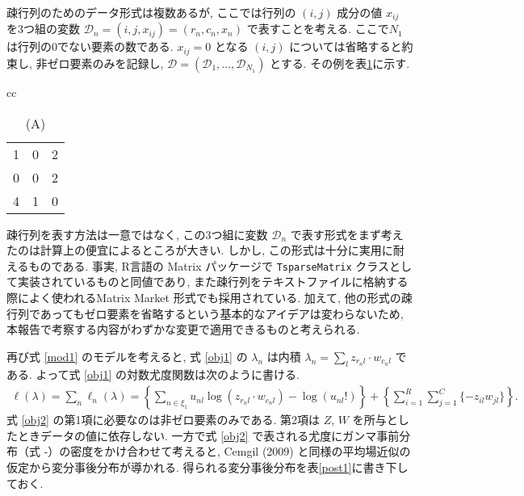 \documentclass[a4paper,12pt]{jsarticle} %
\numberwithin{equation}{section} %
\begin{document}
疎行列のためのデータ形式は複数あるが, ここでは行列の $(i,j)$ 成分の値 $x_{ij}$ を3つ組の変数 $ \mathcal{D}_n  = (i,j,x_{ij})=(r_n, c_n, x_n)$ で表すことを考える. ここで$N_1$ は行列の0でない要素の数である.  $x_{ij}=0$ となる $(i,j)$ については省略すると約束し, 非ゼロ要素のみを記録し, $\mathcal{D}=(\mathcal{D}_1, \ldots, \mathcal{D}_{N_1})$ とする. その例を表\ref{tab1}に示す. 
\begin{table}[tbp]
\centering
\caption{疎行列の例. (A)と(B)は同じ情報を持つ. (B)は本研究で扱う疎行列の形式である. }\label{tab1}
\begin{tabular}{cc}
\begin{subtable}{0.2\linewidth}\centering
{
\caption*{(A)}
\begin{tabular}{|ccc|}
\hline
1 & 0 & 2\\
0 & 0 & 2\\
4 & 1 & 0\\
\hline
\end{tabular}
}
\end{subtable}
\begin{subtable}{0.2\linewidth}
\end{subtable}
\end{tabular}
\end{table}
疎行列を表す方法は一意ではなく, この3つ組に変数 $\mathcal{D}_n$ で表す形式をまず考えたのは計算上の便宜によるところが大きい. しかし, この形式は十分に実用に耐えるものである. 事実, R言語の Matrix パッケージで \verb|TsparseMatrix| クラスとして実装されているものと同値であり, また疎行列をテキストファイルに格納する際によく使われるMatrix Market 形式でも採用されている.  %
加えて, 他の形式の疎行列であってもゼロ要素を省略するという基本的なアイデアは変わらないため, 本報告で考察する内容がわずかな変更で適用できるものと考えられる.

再び式 \eqref{mod1} のモデルを考えると, 式 \eqref{obj1} の $\lambda_n$ は内積 $\lambda_n = \sum_l  z_{r_nl} \cdot w_{c_nl}$ である. よって式 \eqref{obj1} の対数尤度関数は次のように書ける. 
\begin{align}
\ell (\lambda) = \sum_n \ell_n (\lambda) = \left\{ \sum_{n \in \xi_1} u_{nl} \log(z_{r_nl} \cdot w_{c_nl})  - \log(u_{nl}!) \right\} + \left\{  \sum_{i=1}^{R}\sum_{j=1}^C  \{-  z_{il}  w_{jl}\} \right\}. \label{obj2}
\end{align}
式 \eqref{obj2} の第1項に必要なのは非ゼロ要素のみである. 第2項は $Z$, $W$ を所与としたときデータの値に依存しない. 一方で式 \eqref{obj2} で表される尤度にガンマ事前分布（式 -）の密度をかけ合わせて考えると,  Cemgil (2009) と同様の平均場近似の仮定から変分事後分布が導かれる. 得られる変分事後分布を表\ref{post1}に書き下しておく.
\end{document}
